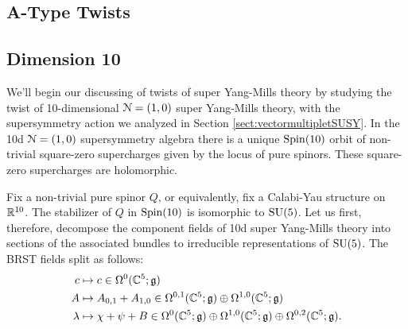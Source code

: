 \documentclass[10pt, oneside]{article}
\begin{document}
\subsection{A-Type Twists} \label{A_twist_section}

\subsection{Dimension 10}
We'll begin our discussing of twists of super Yang-Mills theory by studying the twist of 10-dimensional $\mathcal{N}=(1,0)$ super Yang-Mills theory, with the supersymmetry action we analyzed in Section \ref{sect:vectormultipletSUSY}.  In the 10d $\mathcal{N}=(1,0)$ supersymmetry algebra there is a unique $\mathrm{Spin}(10)$ orbit of non-trivial square-zero supercharges given by the locus of pure spinors.  These square-zero supercharges are holomorphic.

Fix a non-trivial pure spinor $Q$, or equivalently, fix a Calabi-Yau structure on $\mathbb R^{10}$.  The stabilizer of $Q$ in $\mathrm{Spin}(10)$ is isomorphic to $\mathrm{SU}(5)$.  Let us first, therefore, decompose the component fields of 10d super Yang-Mills theory into sections of the associated bundles to irreducible representations of $\mathrm{SU}(5)$.  The BRST fields split as follows:
\begin{align*}
c &\mapsto c \in \Omega^0(\mathbb C^5; \mathfrak{g}) \\
A &\mapsto A_{0, 1} + A_{1, 0} \in \Omega^{0,1}(\mathbb C^5; \mathfrak{g}) \oplus \Omega^{1,0}(\mathbb C^5; \mathfrak{g})\\
\lambda &\mapsto \chi + \psi + B \in \Omega^0(\mathbb C^5; \mathfrak{g}) \oplus \Omega^{1,0}(\mathbb C^5; \mathfrak{g}) \oplus \Omega^{0,2}(\mathbb C^5; \mathfrak{g}). 
\end{align*}
\end{document}

